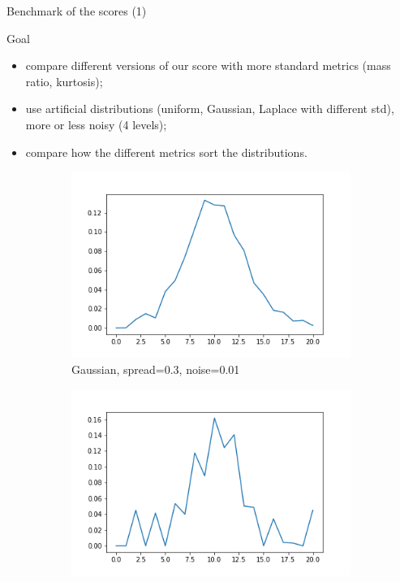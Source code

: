 \documentclass[xcolor=table, hyperref={pdfpagelabels=false}]{beamer}
\begin{document}
\begin{frame}{Benchmark of the scores (1)}
\begin{block}{Goal}
	\begin{itemize}
		\item compare different versions of our score with more standard metrics (mass ratio, kurtosis);
		\item use artificial distributions (uniform, Gaussian, Laplace with different std), more or less noisy (4 levels);
		\item compare how the different metrics sort the distributions.
	\end{itemize}
\end{block}
\begin{figure}[H]
	\centering
	\begin{subfigure}{.2\textwidth}
		\includegraphics[width=\textwidth]{./images/5-g-3-1.png}
		\caption{Gaussian, spread=0.3, noise=0.01}
	\end{subfigure}
	\begin{subfigure}{.2\textwidth}
		\includegraphics[width=\textwidth]{./images/11-g-3-5.png}

\end{subfigure}
\end{figure}
\end{frame}
\end{document}
